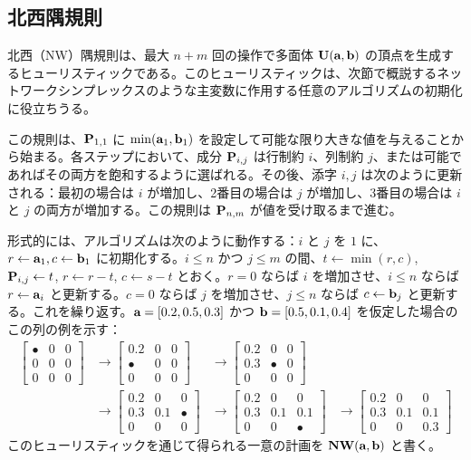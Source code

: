 \subsection{北西隅規則}\label{subsec-northwest}
北西（NW）隅規則は、最大 $n+m$ 回の操作で多面体 $\CouplingsD(\a,\b)$ の頂点を生成するヒューリスティックである。このヒューリスティックは、次節で概説するネットワークシンプレックスのような主変数に作用する任意のアルゴリズムの初期化に役立ちうる。

この規則は、$\P_{1,1}$ に $\min(\a_1,\b_1)$ を設定して可能な限り大きな値を与えることから始まる。各ステップにおいて、成分 $\P_{i,j}$ は行制約 $i$、列制約 $j$、または可能であればその両方を飽和するように選ばれる。その後、添字 $i,j$ は次のように更新される：最初の場合は $i$ が増加し、2番目の場合は $j$ が増加し、3番目の場合は $i$ と $j$ の両方が増加する。この規則は $\P_{n,m}$ が値を受け取るまで進む。

形式的には、アルゴリズムは次のように動作する：$i$ と $j$ を $1$ に、$r\leftarrow\a_1,c\leftarrow \b_1$ に初期化する。$i\leq n$ かつ $j\leq m$ の間、$t\leftarrow \min(r,c)$, $\P_{i,j}\leftarrow t$, $r\leftarrow r-t$, $c\leftarrow s-t$ とおく。$r=0$ ならば $i$ を増加させ、$i\leq n$ ならば $r\leftarrow\a_i$ と更新する。$c=0$ ならば $j$ を増加させ、$j\leq n$ ならば $c\leftarrow \b_j$ と更新する。これを繰り返す。$\a=[0.2,0.5,0.3]$ かつ $\b=[0.5,0.1,0.4]$ を仮定した場合のこの列の例を示す：
$$\begin{aligned}\begin{bmatrix} \bullet & 0 & 0 \\ 0 & 0 & 0 \\ 0& 0 & 0\end{bmatrix} &\rightarrow \begin{bmatrix} 0.2 & 0 & 0 \\ \bullet & 0 & 0 \\ 0& 0 & 0\end{bmatrix} &\rightarrow \begin{bmatrix} 0.2 & 0 & 0 \\ 0.3 & \bullet & 0 \\ 0& 0 & 0\end{bmatrix}\\ &\rightarrow \begin{bmatrix} 0.2 & 0 & 0 \\ 0.3 &0.1 &\bullet \\ 0& 0 & 0\end{bmatrix} &\rightarrow \begin{bmatrix} 0.2 & 0 & 0 \\ 0.3 &0.1 &0.1 \\ 0& 0 & \bullet\end{bmatrix} & \rightarrow \begin{bmatrix} 0.2 & 0 & 0 \\ 0.3 &0.1 &0.1 \\ 0& 0 & 0.3\end{bmatrix}\end{aligned}$$
このヒューリスティックを通じて得られる一意の計画を $\NW(\a,\b)$ と書く。


